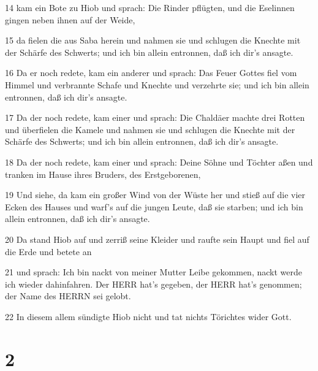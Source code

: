 \par 14 kam ein Bote zu Hiob und sprach: Die Rinder pflügten, und die Eselinnen gingen neben ihnen auf der Weide,
\par 15 da fielen die aus Saba herein und nahmen sie und schlugen die Knechte mit der Schärfe des Schwerts; und ich bin allein entronnen, daß ich dir's ansagte.
\par 16 Da er noch redete, kam ein anderer und sprach: Das Feuer Gottes fiel vom Himmel und verbrannte Schafe und Knechte und verzehrte sie; und ich bin allein entronnen, daß ich dir's ansagte.
\par 17 Da der noch redete, kam einer und sprach: Die Chaldäer machte drei Rotten und überfielen die Kamele und nahmen sie und schlugen die Knechte mit der Schärfe des Schwerts; und ich bin allein entronnen, daß ich dir's ansagte.
\par 18 Da der noch redete, kam einer und sprach: Deine Söhne und Töchter aßen und tranken im Hause ihres Bruders, des Erstgeborenen,
\par 19 Und siehe, da kam ein großer Wind von der Wüste her und stieß auf die vier Ecken des Hauses und warf's auf die jungen Leute, daß sie starben; und ich bin allein entronnen, daß ich dir's ansagte.
\par 20 Da stand Hiob auf und zerriß seine Kleider und raufte sein Haupt und fiel auf die Erde und betete an
\par 21 und sprach: Ich bin nackt von meiner Mutter Leibe gekommen, nackt werde ich wieder dahinfahren. Der HERR hat's gegeben, der HERR hat's genommen; der Name des HERRN sei gelobt.
\par 22 In diesem allem sündigte Hiob nicht und tat nichts Törichtes wider Gott.

\chapter{2}

